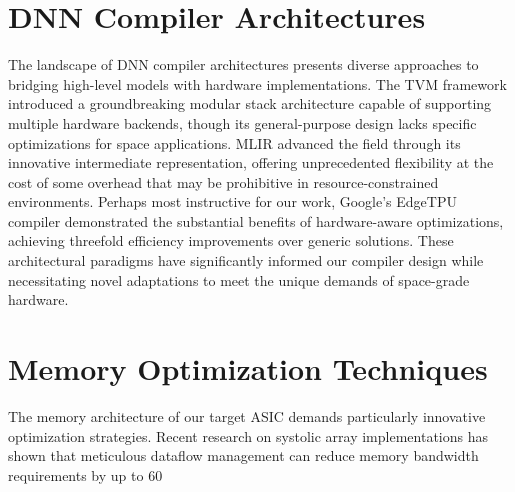 \documentclass[12pt]{report}
\begin{document}
\section{DNN Compiler Architectures}
The landscape of DNN compiler architectures presents diverse approaches to bridging high-level models with hardware implementations. The TVM framework \cite{tvm2018} introduced a groundbreaking modular stack architecture capable of supporting multiple hardware backends, though its general-purpose design lacks specific optimizations for space applications. MLIR \cite{mlir2020} advanced the field through its innovative intermediate representation, offering unprecedented flexibility at the cost of some overhead that may be prohibitive in resource-constrained environments. Perhaps most instructive for our work, Google's EdgeTPU compiler \cite{googletpu2019} demonstrated the substantial benefits of hardware-aware optimizations, achieving threefold efficiency improvements over generic solutions. These architectural paradigms have significantly informed our compiler design while necessitating novel adaptations to meet the unique demands of space-grade hardware.

\section{Memory Optimization Techniques}
The memory architecture of our target ASIC demands particularly innovative optimization strategies. Recent research on systolic array implementations \cite{systolic2021} has shown that meticulous dataflow management can reduce memory bandwidth requirements by up to 60%
\end{document}
